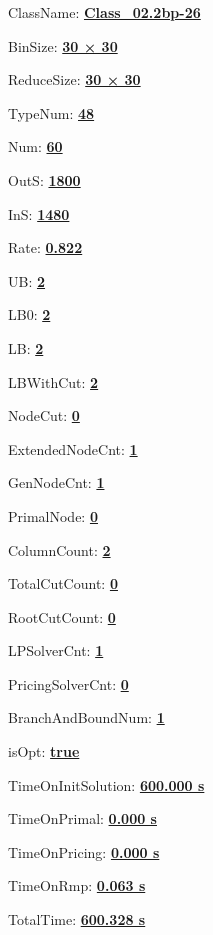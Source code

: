 \documentclass[11pt]{article}
\begin{document}
\pagestyle{empty}


ClassName: \underline{\textbf{Class_02.2bp-26}}
\par
BinSize: \underline{\textbf{30 × 30}}
\par
ReduceSize: \underline{\textbf{30 × 30}}
\par
TypeNum: \underline{\textbf{48}}
\par
Num: \underline{\textbf{60}}
\par
OutS: \underline{\textbf{1800}}
\par
InS: \underline{\textbf{1480}}
\par
Rate: \underline{\textbf{0.822}}
\par
UB: \underline{\textbf{2}}
\par
LB0: \underline{\textbf{2}}
\par
LB: \underline{\textbf{2}}
\par
LBWithCut: \underline{\textbf{2}}
\par
NodeCut: \underline{\textbf{0}}
\par
ExtendedNodeCnt: \underline{\textbf{1}}
\par
GenNodeCnt: \underline{\textbf{1}}
\par
PrimalNode: \underline{\textbf{0}}
\par
ColumnCount: \underline{\textbf{2}}
\par
TotalCutCount: \underline{\textbf{0}}
\par
RootCutCount: \underline{\textbf{0}}
\par
LPSolverCnt: \underline{\textbf{1}}
\par
PricingSolverCnt: \underline{\textbf{0}}
\par
BranchAndBoundNum: \underline{\textbf{1}}
\par
isOpt: \underline{\textbf{true}}
\par
TimeOnInitSolution: \underline{\textbf{600.000 s}}
\par
TimeOnPrimal: \underline{\textbf{0.000 s}}
\par
TimeOnPricing: \underline{\textbf{0.000 s}}
\par
TimeOnRmp: \underline{\textbf{0.063 s}}
\par
TotalTime: \underline{\textbf{600.328 s}}
\par
\newpage
\end{document}
